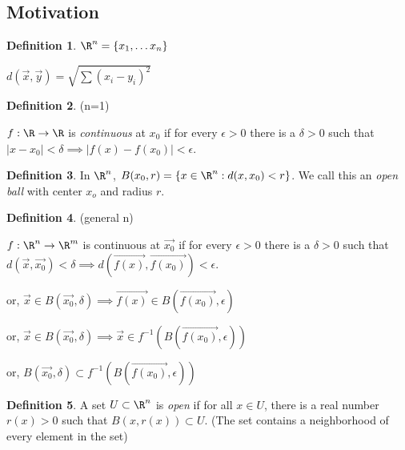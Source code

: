 \documentclass[a5paper]{article}
\theoremstyle{definition}%
\newtheorem*{definition*}{Definition}
\numberwithin{exercise}{section}
\theoremstyle{remark}%
\begin{document}
\subsection{Motivation}

\begin{definition*}
$\R^n=\{x_1,\ldots x_n\}$

$d(\vec{x}, \vec{y})=\sqrt{\sum(x_i-y_i)^2}$
\end{definition*}

\begin{definition*}(n=1)

$f:\R \to \R$ is \emph{continuous} at $x_0$ if for every $\epsilon > 0$ there is a $\delta > 0$ such that $|x-x_0| < \delta \implies |f(x)-f(x_0)| < \epsilon$.
\end{definition*}

\begin{definition*}
In $\R^n$, $B(x_0, r)=\{x\in \R^n : d(x,x_0) < r\}$. We call this an \emph{open ball} with center $x_o$ and radius $r$. 
\end{definition*}

\begin{definition*}(general n)

$f:\R^n \to \R^m$ is continuous at $\vec{x_0}$ if for every $\epsilon > 0$ there is a $\delta > 0$ such that $d(\vec{x},\vec{x_0}) < \delta \implies d(\vec{f(x)},\vec{f(x_0)}) < \epsilon$.

or, $\vec{x} \in B(\vec{x_0},\delta) \implies \vec{f(x)} \in B(\vec{f(x_0)},\epsilon)$

or, $\vec{x} \in B(\vec{x_0},\delta) \implies \vec{x} \in f^{-1}(B(\vec{f(x_0)},\epsilon))$

or, $B(\vec{x_0},\delta) \subset f^{-1}(B(\vec{f(x_0)},\epsilon))$
\end{definition*}

\begin{definition*}
A set $U \subset \R^n$ is \emph{open} if for all $x \in U$, there is a real number $r(x)>0$ such that $B(x,r(x))\subset U$. (The set contains a neighborhood of every element in the set)
\end{definition*}
\end{document}
